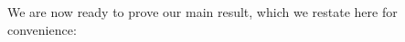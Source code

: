 \documentclass{patmorin}
\begin{document}




We are now ready to prove our main result, which we restate here for convenience:

\mmg*
\end{document}
